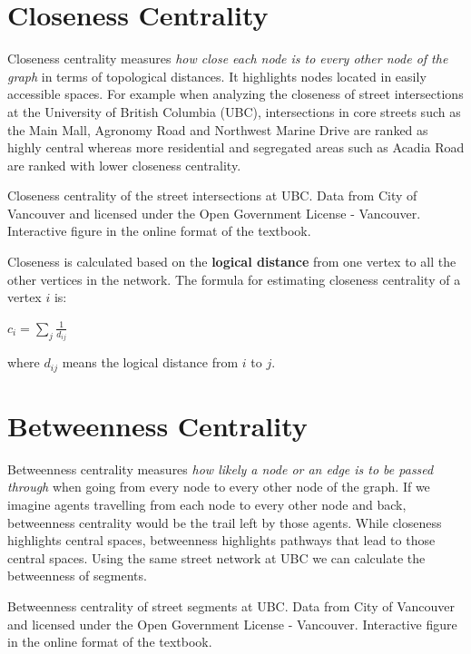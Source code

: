 \documentclass[
]{book}
\begin{document}
\hypertarget{closeness-centrality}{%
\section{Closeness Centrality}\label{closeness-centrality}}

Closeness centrality measures \emph{how close each node is to every other node of the graph} in terms of topological distances. It highlights nodes located in easily accessible spaces. For example when analyzing the closeness of street intersections at the University of British Columbia (UBC), intersections in core streets such as the Main Mall, Agronomy Road and Northwest Marine Drive are ranked as highly central whereas more residential and segregated areas such as Acadia Road are ranked with lower closeness centrality.

\label{fig:unnamed-chunk-24}Closeness centrality of the street intersections at UBC. Data from City of Vancouver and licensed under the Open Government License - Vancouver. Interactive figure in the online format of the textbook.

Closeness is calculated based on the \textbf{logical distance} from one vertex to all the other vertices in the network. The formula for estimating closeness centrality of a vertex \(i\) is:

\(c_i = \sum\limits_{j} \frac{1}{d_{ij}}\)

where \(d_{ij}\) means the logical distance from \(i\) to \(j\).

\hypertarget{betweenness-centrality}{%
\section{Betweenness Centrality}\label{betweenness-centrality}}

Betweenness centrality measures \emph{how likely a node or an edge is to be passed through} when going from every node to every other node of the graph. If we imagine agents travelling from each node to every other node and back, betweenness centrality would be the trail left by those agents. While closeness highlights central spaces, betweenness highlights pathways that lead to those central spaces. Using the same street network at UBC we can calculate the betweenness of segments.

\label{fig:unnamed-chunk-25}Betweenness centrality of street segments at UBC. Data from City of Vancouver and licensed under the Open Government License - Vancouver. Interactive figure in the online format of the textbook.
\end{document}
